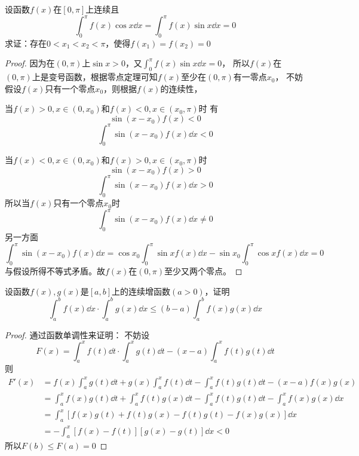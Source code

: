 \begin{example}
    设函数$f(x)$在$[0,\pi]$上连续且
    \[ \int_0^\pi f(x)\cos x\dd{x} = \int_0^\pi f(x)\sin x\dd{x} = 0 \]
    求证：存在$0<x_1<x_2<\pi$，使得$f(x_1)=f(x_2)=0$
\end{example}
\begin{proof}
    因为在$(0,\pi)$上$\sin x > 0$，又$\int_0^\pi f(x)\sin x\dd{x} = 0$，
    所以$f(x)$在$(0,\pi)$上是变号函数，根据零点定理可知$f(x)$至少在$(0,\pi)$有一零点$x_0$，
    不妨假设$f(x)$只有一个零点$x_0$，则根据$f(x)$的连续性，

    当$f(x)>0,x\in(0,x_0)$和$f(x)<0,x\in(x_0,\pi)$时
    有
    \[ \sin(x-x_0)f(x) < 0 \]
    \[ \int_0^\pi \sin(x-x_0)f(x)\dd{x} < 0 \]

    当$f(x)<0,x\in(0,x_0)$和$f(x)>0,x\in(x_0,\pi)$时
    \[ \sin(x-x_0)f(x) > 0 \]
    \[ \int_0^\pi \sin(x-x_0)f(x)\dd{x} > 0 \]
    所以当$f(x)$只有一个零点$x_0$时
    \[ \int_0^\pi \sin(x-x_0)f(x)\dd{x} \neq 0 \]
    另一方面
    \[
        \int_0^\pi \sin(x-x_0)f(x)\dd{x}
        =
        \cos x_0\int_0^\pi \sin xf(x)\dd{x} - \sin x_0\int_0^\pi \cos xf(x)\dd{x}
        =
        0
    \]
    与假设所得不等式矛盾。故$f(x)$在$(0,\pi)$至少又两个零点。
\end{proof}
\begin{example}
    设函数$f(x),g(x)$是$[a,b]$上的连续增函数$(a>0)$，证明
    \[ \int_a^bf(x)\dd{x} \cdot \int_a^bg(x)\dd{x} \leq (b-a)\int_a^bf(x)g(x)\dd{x} \]
\end{example}
\begin{proof}
    通过函数单调性来证明：
    不妨设
    \[ F(x) = \int_a^xf(t)\dd{t} \cdot \int_a^xg(t)\dd{t} - (x-a)\int_a^xf(t)g(t)\dd{t} \]
    则
    \begin{align*}
        F'(x) & = f(x)\int_a^xg(t)\dd{t} + g(x)\int_a^xf(t)\dd{t} - \int_a^xf(t)g(t)\dd{t} - (x-a)f(x)g(x)          \\
              & =\int_a^xf(x)g(t)\dd{t} + \int_a^xf(t)g(x)\dd{t} - \int_a^xf(t)g(t)\dd{t} - \int_a^x f(x)g(x)\dd{x} \\
              & =\int_a^x[f(x)g(t) + f(t)g(x) - f(t)g(t) -  f(x)g(x)]\dd{x}                                         \\
              & =-\int_a^x[f(x)- f(t)][g(x) - g(t)]\dd{x} < 0
    \end{align*}
    所以$F(b)\leq F(a)=0$
\end{proof}


